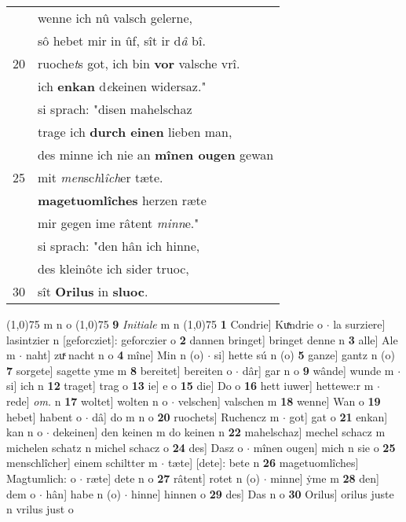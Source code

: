 \documentclass[8pt,a4paper,notitlepage]{article}
\begin{document}
\begin{table}[ht]
\begin{minipage}[t]{0.5\linewidth}
\begin{tabular}{rl}
 & wenne ich nû valsch gelerne,\\ 
 & sô hebet mir in ûf, sît ir d\textit{â} bî.\\ 
20 & ruoche\textit{t}s got, ich bin \textbf{vor} valsche vrî.\\ 
 & ich \textbf{enkan} d\textit{e}keinen widersaz."\\ 
 & si sprach: "disen mahelschaz\\ 
 & trage ich \textbf{durch einen} lieben man,\\ 
 & des minne ich nie an \textbf{mînen ougen} gewan\\ 
25 & mit \textit{men}sc\textit{h}l\textit{îch}er tæte.\\ 
 & \textbf{magetuomlîches} herzen ræte\\ 
 & mir gegen ime râtent \textit{minn}e."\\ 
 & si sprach: "den hân ich hinne,\\ 
 & des kleinôte ich sider truoc,\\ 
30 & sît \textbf{Orilus} in \textbf{sluoc}.\\ 
\end{tabular}
\scriptsize
\line(1,0){75} \newline
m n o \newline
\line(1,0){75} \newline
\textbf{9} \textit{Initiale} m n  \newline
\line(1,0){75} \newline
\textbf{1} Condrie] Kuͯndrie o  $\cdot$ la surziere] lasintzier n [geforcziet]: geforczier o \textbf{2} dannen bringet] bringet denne n \textbf{3} alle] Ale m  $\cdot$ naht] zuͯ nacht n o \textbf{4} mîne] Min n (o)  $\cdot$ si] hette sú n (o) \textbf{5} ganze] gantz n (o) \textbf{7} sorgete] sagette yme m \textbf{8} bereitet] bereiten o  $\cdot$ dâr] gar n o \textbf{9} wânde] wunde m  $\cdot$ si] ich n \textbf{12} traget] trag o \textbf{13} ie] e o \textbf{15} die] Do o \textbf{16} hett iuwer] hettewe:r m  $\cdot$ rede] \textit{om.} n \textbf{17} woltet] wolten n o  $\cdot$ velschen] valschen m \textbf{18} wenne] Wan o \textbf{19} hebet] habent o  $\cdot$ dâ] do m n o \textbf{20} ruochets] Ruchencz m  $\cdot$ got] gat o \textbf{21} enkan] kan n o  $\cdot$ dekeinen] den keinen m do keinen n \textbf{22} mahelschaz] mechel schacz m michelen schatz n michel schacz o \textbf{24} des] Dasz o  $\cdot$ mînen ougen] mich n sie o \textbf{25} menschlîcher] einem schiltter m  $\cdot$ tæte] [dete]: bete n \textbf{26} magetuomlîches] Magtumlich: o  $\cdot$ ræte] dete n o \textbf{27} râtent] rotet n (o)  $\cdot$ minne] ẏme m \textbf{28} den] dem o  $\cdot$ hân] habe n (o)  $\cdot$ hinne] hinnen o \textbf{29} des] Das n o \textbf{30} Orilus] orilus juste n vrilus just o \newline
\end{minipage}
\end{table}
\end{document}
